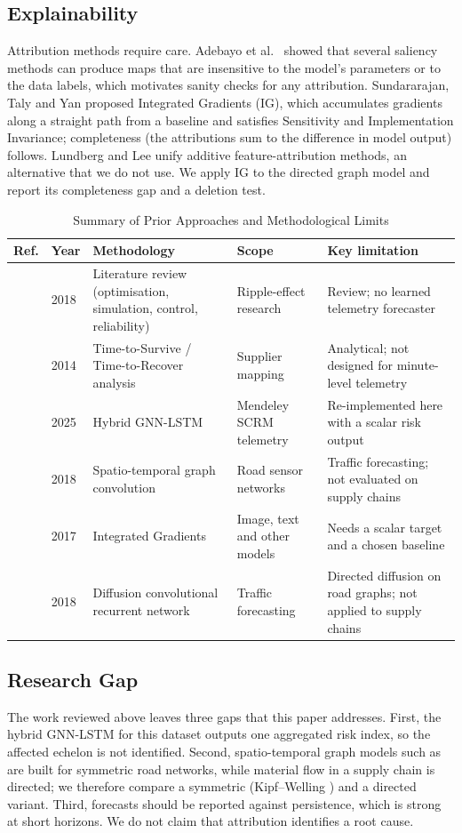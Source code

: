 \documentclass[conference]{IEEEtran}
\begin{document}
\subsection{Explainability}
Attribution methods require care. Adebayo et al.\ \cite{r15} showed that several saliency methods can produce maps that are insensitive to the model's parameters or to the data labels, which motivates sanity checks for any attribution. Sundararajan, Taly and Yan \cite{r8} proposed Integrated Gradients (IG), which accumulates gradients along a straight path from a baseline and satisfies Sensitivity and Implementation Invariance; completeness (the attributions sum to the difference in model output) follows. Lundberg and Lee \cite{r19} unify additive feature-attribution methods, an alternative that we do not use. We apply IG to the directed graph model and report its completeness gap and a deletion test.

\begin{table}[t]
\caption{Summary of Prior Approaches and Methodological Limits}
\label{tab:prior}
\centering
\footnotesize
\begin{tabular}{@{}p{0.7cm}p{0.7cm}p{2.0cm}p{1.6cm}p{2.2cm}@{}}
\toprule
Ref. & Year & Methodology & Scope & Key limitation \\
\midrule
\cite{r7}  & 2018 & Literature review (optimisation, simulation, control, reliability) & Ripple-effect research & Review; no learned telemetry forecaster \\
\cite{r2}  & 2014 & Time-to-Survive / Time-to-Recover analysis & Supplier mapping & Analytical; not designed for minute-level telemetry \\
\cite{r10} & 2025 & Hybrid GNN-LSTM & Mendeley SCRM telemetry & Re-implemented here with a scalar risk output \\
\cite{r5}  & 2018 & Spatio-temporal graph convolution & Road sensor networks & Traffic forecasting; not evaluated on supply chains \\
\cite{r8}  & 2017 & Integrated Gradients & Image, text and other models & Needs a scalar target and a chosen baseline \\
\cite{r17} & 2018 & Diffusion convolutional recurrent network & Traffic forecasting & Directed diffusion on road graphs; not applied to supply chains \\
\bottomrule
\end{tabular}
\end{table}

\subsection{Research Gap}
The work reviewed above leaves three gaps that this paper addresses. First, the hybrid GNN-LSTM for this dataset \cite{r10} outputs one aggregated risk index, so the affected echelon is not identified. Second, spatio-temporal graph models such as \cite{r5} are built for symmetric road networks, while material flow in a supply chain is directed; we therefore compare a symmetric (Kipf--Welling \cite{r6}) and a directed variant. Third, forecasts should be reported against persistence, which is strong at short horizons. We do not claim that attribution identifies a root cause.
\end{document}
